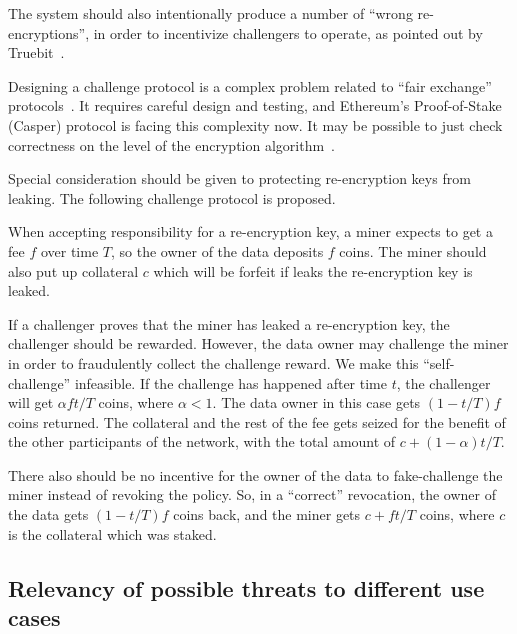 \documentclass[longbibliography,nofootinbib]{revtex4-1}
\begin{document}
The system should also intentionally produce a number of ``wrong re-encryptions'', in order to incentivize challengers to operate, as pointed out by
Truebit~\cite{truebit}.

Designing a challenge protocol is a complex problem related to ``fair exchange'' protocols~\cite{BitcoinMPC2016,Bentov2014,AccountableStorage}.
It requires careful design and testing, and Ethereum's Proof-of-Stake (Casper) protocol is facing this complexity now.
It may be possible to just check correctness on the level of the encryption algorithm~\cite{Zhou2002}.

Special consideration should be given to protecting re-encryption keys from leaking.
The following challenge protocol is proposed.

When accepting responsibility for a re-encryption key, a miner expects to get a fee $f$ over time $T$, so the owner of the data deposits $f$ coins.
The miner should also put up collateral $c$ which will be forfeit if leaks the re-encryption key is leaked.

If a challenger proves that the miner has leaked a re-encryption key, the challenger should be rewarded.
However, the data owner may challenge the miner in order to fraudulently collect the challenge reward.
We make this ``self-challenge'' infeasible.
If the challenge has happened after time $t$, the challenger will get
$\alpha f t/T$ coins, where $\alpha < 1$.
The data owner in this case gets $(1 - t/T) f$ coins returned.
The collateral and the rest of the fee gets seized for the benefit of the other participants of the network, with the total amount of $c + (1 - \alpha) t/T$.

There also should be no incentive for the owner of the data to fake-challenge the miner instead of revoking the policy.
So, in a ``correct'' revocation, the owner of the data gets $(1 - t/T) f$ coins back, and the miner gets $c + ft/T$ coins, where $c$ is the collateral which
was staked.


\subsection{Relevancy of possible threats to different use cases}
\end{document}
